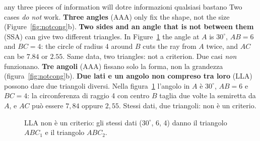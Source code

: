 \begin{trap}{any three pieces of information will do}{tre informazioni qualsiasi bastano}
Two cases \emph{do not} work. \textbf{Three angles} (AAA) only fix the shape, not the size (Figure~\ref{fig:notcong}b). \textbf{Two sides and an angle that is not between them} (SSA) can give two different triangles. In Figure~\ref{fig:ssa} the angle at $A$ is $30^\circ$, $AB = 6$ and $BC = 4$: the circle of radius 4 around $B$ cuts the ray from $A$ twice, and $AC$ can be $7.84$ or $2.55$. Same data, two triangles: not a criterion.
\tcblower
Due casi \emph{non} funzionano. \textbf{Tre angoli} (AAA) fissano solo la forma, non la grandezza (figura~\ref{fig:notcong}b). \textbf{Due lati e un angolo non compreso tra loro} (LLA) possono dare due triangoli diversi. Nella figura~\ref{fig:ssa} l'angolo in $A$ è $30^\circ$, $AB = 6$ e $BC = 4$: la circonferenza di raggio 4 con centro $B$ taglia due volte la semiretta da $A$, e $AC$ può essere $7{,}84$ oppure $2{,}55$. Stessi dati, due triangoli: non è un criterio.
\end{trap}

\begin{figure}[htbp]
\centering
%
      {LLA non è un criterio: gli stessi dati ($30^\circ$, 6, 4) danno il triangolo $ABC_1$ e il triangolo $ABC_2$.}
\label{fig:ssa}
\end{figure}

